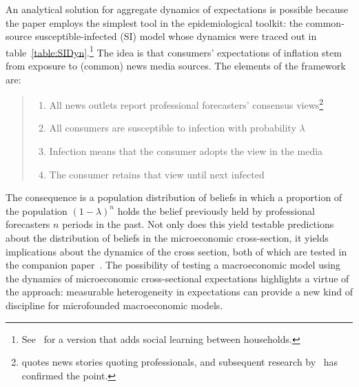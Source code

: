 An analytical solution for aggregate dynamics of expectations is possible because the paper employs the simplest tool in the epidemiological toolkit: the common-source susceptible-infected (SI) model whose dynamics were traced out in table~\ref{table:SIDyn}.\footnote{See~\cite{easaw2015households} for a version that adds social learning between households.}   The idea is that consumers' expectations of inflation stem from exposure to (common) news media sources.  The elements of the framework are:
\begin{quote}
    \normalfont
\begin{enumerate}
    \item All news outlets report professional forecasters' consensus views\footnote{\cite{carroll2003macroeconomic} quotes news stories quoting professionals, and subsequent research by~\cite{lamla2014role} has confirmed the point.}
    \item All consumers are susceptible to infection with probability $\lambda$
    \item Infection means that the consumer adopts the view in the media
    \item The consumer retains that view until next infected
\end{enumerate}
\end{quote}

The consequence is a population distribution of beliefs in which a proportion of the population $(1-\lambda)^{n}$ holds the belief previously held by professional forecasters $n$ periods in the past.  Not only does this yield testable predictions about the distribution of beliefs in the microeconomic cross-section, it yields implications about the dynamics of the cross section, both of which are tested in the companion paper~\cite{carroll2001epidemiology}.  The possibility of testing a macroeconomic model using the dynamics of microeconomic cross-sectional expectations highlights a virtue of the approach:  measurable heterogeneity in expectations can provide a new kind of discipline for microfounded macroeconomic models.


